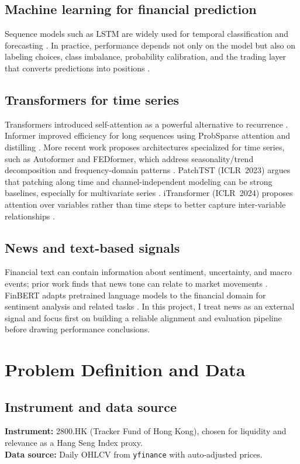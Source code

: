 \documentclass[12pt,a4paper,oneside]{report}
\begin{document}
\section{Machine learning for financial prediction}
Sequence models such as LSTM are widely used for temporal classification and forecasting \citep{lstm1997}. In practice, performance depends not only on the model but also on labeling choices, class imbalance, probability calibration, and the trading layer that converts predictions into positions \citep{lopezdeprado2018}.

\section{Transformers for time series}
Transformers introduced self-attention as a powerful alternative to recurrence \citep{vaswani2017}. Informer improved efficiency for long sequences using ProbSparse attention and distilling \citep{informer2021}. More recent work proposes architectures specialized for time series, such as Autoformer and FEDformer, which address seasonality/trend decomposition and frequency-domain patterns \citep{autoformer2021,fedformer2022}. PatchTST (ICLR~2023) argues that patching along time and channel-independent modeling can be strong baselines, especially for multivariate series \citep{patchtst2023}. iTransformer (ICLR~2024) proposes attention over variables rather than time steps to better capture inter-variable relationships \citep{itransformer2024}.

\section{News and text-based signals}
Financial text can contain information about sentiment, uncertainty, and macro events; prior work finds that news tone can relate to market movements \citep{tetlock2007}. FinBERT adapts pretrained language models to the financial domain for sentiment analysis and related tasks \citep{araci2019finbert}. In this project, I treat news as an external signal and focus first on building a reliable alignment and evaluation pipeline before drawing performance conclusions.

\chapter{Problem Definition and Data}
\section{Instrument and data source}
\textbf{Instrument:} 2800.HK (Tracker Fund of Hong Kong), chosen for liquidity and relevance as a Hang Seng Index proxy.\\
\textbf{Data source:} Daily OHLCV from \texttt{yfinance} with auto-adjusted prices.
\end{document}
